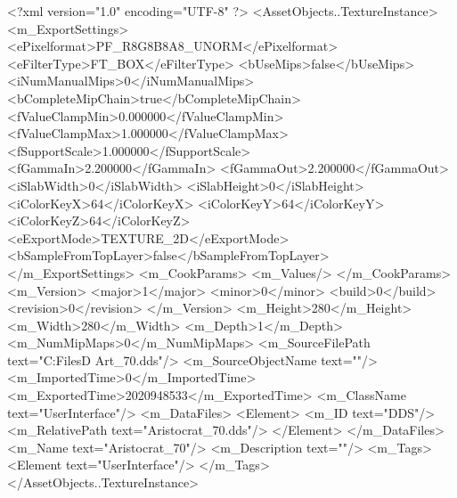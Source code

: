 <?xml version="1.0" encoding="UTF-8" ?>
<AssetObjects..TextureInstance>
	<m_ExportSettings>
		<ePixelformat>PF_R8G8B8A8_UNORM</ePixelformat>
		<eFilterType>FT_BOX</eFilterType>
		<bUseMips>false</bUseMips>
		<iNumManualMips>0</iNumManualMips>
		<bCompleteMipChain>true</bCompleteMipChain>
		<fValueClampMin>0.000000</fValueClampMin>
		<fValueClampMax>1.000000</fValueClampMax>
		<fSupportScale>1.000000</fSupportScale>
		<fGammaIn>2.200000</fGammaIn>
		<fGammaOut>2.200000</fGammaOut>
		<iSlabWidth>0</iSlabWidth>
		<iSlabHeight>0</iSlabHeight>
		<iColorKeyX>64</iColorKeyX>
		<iColorKeyY>64</iColorKeyY>
		<iColorKeyZ>64</iColorKeyZ>
		<eExportMode>TEXTURE_2D</eExportMode>
		<bSampleFromTopLayer>false</bSampleFromTopLayer>
	</m_ExportSettings>
	<m_CookParams>
		<m_Values/>
	</m_CookParams>
	<m_Version>
		<major>1</major>
		<minor>0</minor>
		<build>0</build>
		<revision>0</revision>
	</m_Version>
	<m_Height>280</m_Height>
	<m_Width>280</m_Width>
	<m_Depth>1</m_Depth>
	<m_NumMipMaps>0</m_NumMipMaps>
	<m_SourceFilePath text="C:\Users\Shadow\Desktop\Working Files\2D Art\Quarters\Aristocrat\Aristocrat_70.dds"/>
	<m_SourceObjectName text=""/>
	<m_ImportedTime>0</m_ImportedTime>
	<m_ExportedTime>2020948533</m_ExportedTime>
	<m_ClassName text="UserInterface"/>
	<m_DataFiles>
		<Element>
			<m_ID text="DDS"/>
			<m_RelativePath text="Aristocrat_70.dds"/>
		</Element>
	</m_DataFiles>
	<m_Name text="Aristocrat_70"/>
	<m_Description text=""/>
	<m_Tags>
		<Element text="UserInterface"/>
	</m_Tags>
</AssetObjects..TextureInstance>

